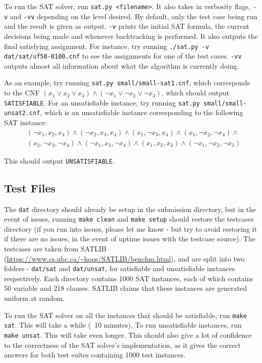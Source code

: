 \documentclass[11pt]{article}
\begin{document}
To run the SAT solver, run \texttt{sat.py <filename>}. It also takes in verbosity flags, \texttt{-v} and \texttt{-vv} depending on the level desired. By default, only the test case being run and the result is given as output. \texttt{-v} prints the initial SAT formula, the current decisions being made and whenever backtracking is performed. It also outputs the final satisfying assignment. For instance, try running \texttt{./sat.py -v dat/sat/uf50-0100.cnf} to see the assignments for one of the test cases. \texttt{-vv} outputs almost all information about what the algorithm is currently doing.

As an example, try running \texttt{sat.py small/small-sat1.cnf}, which corresponds to the CNF $(x_1 \vee x_2 \vee x_3) \wedge (\neg x_1 \vee \neg x_2 \vee \neg x_3)$, which should output \texttt{SATISFIABLE}. For an unsatisfiable instance, try running \texttt{sat.py small/small-unsat2.cnf}, which is an unsatisfiable instance corresponding to the following SAT instance:
\begin{align*}
& (\neg x_1,  x_2,  x_4) \wedge
(\neg x_2,  x_3,  x_4) \wedge
( x_1, \neg x_3,   x_4)  \wedge
( x_1, \neg x_2, \neg x_4)  \wedge \\
& ( x_2, \neg x_3, \neg x_4)  \wedge
(\neg x_1,   x_3, \neg x_4)  \wedge
(  x_1,  x_2,   x_3)  \wedge
(\neg x_1, \neg x_2, \neg x_3)  
\end{align*}

This should output \texttt{UNSATISFIABLE}.

\subsection{Test Files}

The \texttt{dat} directory should already be setup in the submission directory, but in the event of issues, running \texttt{make clean} and \texttt{make setup} should restore the testcases directory (if you run into issues, please let me know - but try to avoid restoring it if there are no issues, in the event of uptime issues with the testcase source). The testcases are taken from SATLIB (\url{https://www.cs.ubc.ca/~hoos/SATLIB/benchm.html}), and are split into two folders - \texttt{dat/sat} and \texttt{dat/unsat}, for satisfiable and unsatisfiable instances respectively. Each directory contains 1000 SAT instances, each of which contains 50 variable and 218 clauses. SATLIB claims that these instances are generated uniform at random.

To run the SAT solver on all the instances that should be satisfiable, run \texttt{make sat}. This will take a while (~10 minutes). To run unsatisfiable instances, run \texttt{make unsat}. This will take even longer. This should also give a lot of confidence to the correctness of the SAT solver's implementation, as it gives the correct answers for both test suites containing 1000 test instances.
\end{document}
